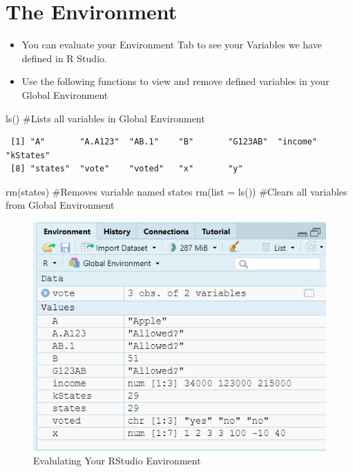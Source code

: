\documentclass[
  letterpaper,
  DIV=11,
  numbers=noendperiod]{scrreprt}
\newenvironment{Shaded}{\begin{snugshade}}{\end{snugshade}}
\newcommand{\AttributeTok}[1]{\textcolor[rgb]{0.40,0.45,0.13}{#1}}
\newcommand{\CommentTok}[1]{\textcolor[rgb]{0.37,0.37,0.37}{#1}}
\newcommand{\FunctionTok}[1]{\textcolor[rgb]{0.28,0.35,0.67}{#1}}
\newcommand{\NormalTok}[1]{\textcolor[rgb]{0.00,0.23,0.31}{#1}}
\providecommand{\tightlist}{%
  \setlength{\itemsep}{0pt}\setlength{\parskip}{0pt}}\usepackage{longtable,booktabs,array}
\begin{document}
\section{The Environment}\label{the-environment}

\begin{itemize}
\tightlist
\item
  You can evaluate your Environment Tab to see your Variables we have
  defined in R Studio.
\item
  Use the following functions to view and remove defined variables in
  your Global Environment
\end{itemize}

\begin{Shaded}
\begin{Highlighting}[]
\FunctionTok{ls}\NormalTok{()  }\CommentTok{\#Lists all variables in Global Environment }
\end{Highlighting}
\end{Shaded}

\begin{verbatim}
 [1] "A"       "A.A123"  "AB.1"    "B"       "G123AB"  "income"  "kStates"
 [8] "states"  "vote"    "voted"   "x"       "y"      
\end{verbatim}

\begin{Shaded}
\begin{Highlighting}[]
\FunctionTok{rm}\NormalTok{(states)  }\CommentTok{\#Removes variable named states}
\FunctionTok{rm}\NormalTok{(}\AttributeTok{list =} \FunctionTok{ls}\NormalTok{())  }\CommentTok{\#Clears all variables from Global Environment}
\end{Highlighting}
\end{Shaded}

\begin{figure}[H]

{\centering \includegraphics{Pictures/Ch1/Environment.png}

}

\caption{Evalulating Your RStudio Environment}

\end{figure}%
\end{document}
